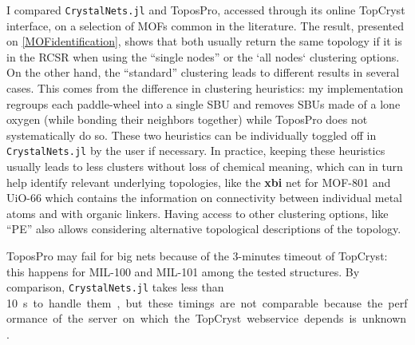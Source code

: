 \documentclass[main.tex]{subfiles}
\begin{document}
I compared \texttt{CrystalNets.jl} and ToposPro, accessed through its online TopCryst interface, on a selection of MOFs common in the literature. The result, presented on \cref{MOFidentification}, shows that both usually return the same topology if it is in the RCSR when using the ``single nodes'' or the `all nodes` clustering options. On the other hand, the ``standard'' clustering leads to different results in several cases. This comes from the difference in clustering heuristics: my implementation regroups each paddle-wheel into a single SBU and removes SBUs made of a lone oxygen (while bonding their neighbors together) while ToposPro does not systematically do so. These two heuristics can be individually toggled off in \texttt{CrystalNets.jl} by the user if necessary. In practice, keeping these heuristics usually leads to less clusters without loss of chemical meaning, which can in turn help identify relevant underlying topologies, like the \textbf{xbi} net for MOF-801 and UiO-66 which contains the information on connectivity between individual metal atoms and with organic linkers. Having access to other clustering options, like ``PE'' also allows considering alternative topological descriptions of the topology.

ToposPro may fail for big nets because of the 3-minutes timeout of TopCryst: this happens for MIL-100 and MIL-101 among the tested structures. By comparison, \texttt{CrystalNets.jl} takes less than \SI{10}s to handle them, but these timings are not comparable because the performance of the server on which the TopCryst webservice depends is unknown.
\end{document}
